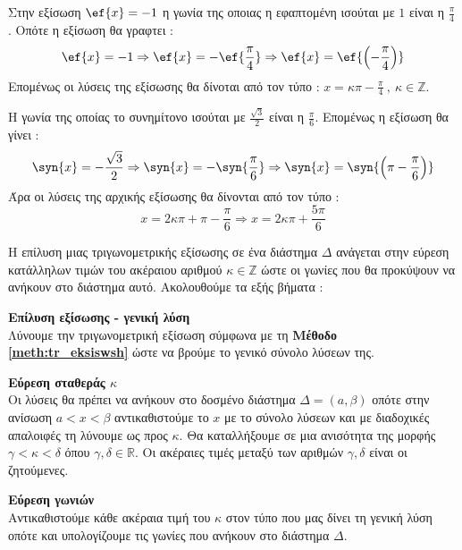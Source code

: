 \lysh
\begin{rlist}
\item Στην εξίσωση $ \ef{x}=-1 $ η γωνία της οποιας η εφαπτομένη ισούται με $ 1 $ είναι η $ \frac{\pi}{4} $. Οπότε η εξίσωση θα γραφτει :
\[ \ef{x}=-1\Rightarrow \ef{x}=-\ef{\frac{\pi}{4}}\Rightarrow \ef{x}=\ef{\left( -\frac{\pi}{4}\right)} \]
Επομένως οι λύσεις της εξίσωσης θα δίνοται από τον τύπο :
$ x=\kappa\pi-\frac{\pi}{4}\ ,\ \kappa\in\mathbb{Z} $.
\item Η γωνία της οποίας το συνημίτονο ισούται με $ \frac{\sqrt{3}}{2} $ είναι η $ \frac{\pi}{6} $. Επομένως η εξίσωση θα γίνει :
\[ \syn{x}=-\frac{\sqrt{3}}{2}\Rightarrow\syn{x}=-\syn{\frac{\pi}{6}}\Rightarrow \syn{x}=\syn{\left(\pi-\frac{\pi}{6}\right) } \]
Άρα οι λύσεις της αρχικής εξίσωσης θα δίνονται από τον τύπο :
\[ x=2\kappa\pi+\pi-\frac{\pi}{6}\Rightarrow x=2\kappa\pi+\frac{5\pi}{6} \]
\end{rlist}
\begin{Methodos}{3cm}
Η επίλυση μιας τριγωνομετρικής εξίσωσης σε ένα διάστημα $ \varDelta $ ανάγεται στην εύρεση κατάλληλων τιμών του ακέραιου αριθμού $ \kappa\in\mathbb{Z} $ ώστε οι γωνίες που θα προκύψουν να ανήκουν στο διάστημα αυτό. Ακολουθούμε τα εξής βήματα :
\begin{bhma}
\item \textbf{Επίλυση εξίσωσης - γενική λύση}\\
Λύνουμε την τριγωνομετρική εξίσωση σύμφωνα με τη \textbf{Μέθοδο \ref{meth:tr_eksiswsh}} ώστε να βρούμε το γενικό σύνολο λύσεων της.
\item \textbf{Εύρεση σταθεράς {\boldmath$ \kappa $}}\\
Oι λύσεις θα πρέπει να ανήκουν στο δοσμένο διάστημα $ \varDelta=(a,\beta) $ οπότε στην ανίσωση $ a<x<\beta $ αντικαθιστούμε το $ x $ με το σύνολο λύσεων και με διαδοχικές απαλοιφές τη λύνουμε ως προς $ \kappa $. Θα καταλλήξουμε σε μια ανισότητα της μορφής $ \gamma<\kappa<\delta $ όπου $ \gamma,\delta\in\mathbb{R} $. Οι ακέραιες τιμές μεταξύ των αριθμών $ \gamma,\delta $ είναι οι ζητούμενες.
\item \textbf{Εύρεση γωνιών}\\
Αντικαθιστούμε κάθε ακέραια τιμή του $ \kappa $ στον τύπο που μας δίνει τη γενική λύση οπότε και υπολογίζουμε τις γωνίες που ανήκουν στο διάστημα $ \varDelta $.
\end{bhma}
\end{Methodos}
